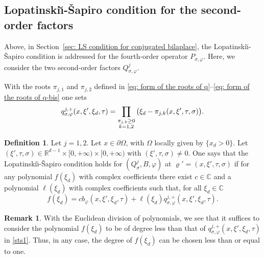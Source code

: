 \documentclass[JEP,XML,SOM,Unicode,published]{cedram}
\theoremstyle{plain}
\theoremstyle{definition}
\newtheorem{definition}[theorem]{Definition}
\newtheorem{remark}[theorem]{Remark}
\def\R{\mathbb{R}}
\def\C{\mathbb{C}}
\newcommand{\LS}{Lopatinski\u{\i}-\v{S}apiro\xspace}
\let\k\kappa
\let\y\varrho
\let \Im \relax
\DeclareMathOperator{\Im}{Im}
\newcommand{\Qsig}{Q_{\sigma}}
\newcommand{\Pconj}{P_{\sigma,\varphi}}
\newcommand{\Qconj}{Q_{\sigma,\varphi}}
\newcommand{\qconj}{q_{\sigma,\varphi}}
\begin{document}
\subsection{Lopatinski\u{\i}-\v{S}apiro condition for the
second-order factors}

Above, in Section~\ref{sec: LS condition for conjugated bilaplace}, the \LS condition is addressed for the
fourth-order operator $\Pconj$. Here, we consider the
two second-order factors $\Qconj^j$.

With the roots $\pi_{j,1}$ and $\pi_{j,2}$ defined in \eqref{eq: form of the roots of q}--\eqref{eq: form of the
roots of q-bis} one sets
\begin{equation*}
\qconj^{j,+} (x,\xi', \xi_d ,\tau)
=\prod_{\substack{\Im\pi_{j,k} \geq 0\\k=1,2}}
\big(\xi_d-\pi_{j,k} (x,\xi',\tau,\sigma) \big).
\end{equation*}

\begin{definition}\label{de2}
Let $j=1,2$. Let $x \in \partial\Omega$, with $\Omega$ locally given by
$\{ x_d>0\}$.
Let $(\xi',\tau,\sigma)\in \R^{d-1}\times [0,+\infty) \times
[0,+\infty)$ with
$(\xi',\tau,\sigma)\neq0$. One says that the \LS condition holds for
$(\Qsig^j,B, \varphi)$ at $\y' = (x,\xi',\tau,\sigma)$ if for any
polynomial $f(\xi_d)$ with complex coefficients there
exist $c\in\C$ and a polynomial $\ell(\xi_d)$ with
complex coefficients such that, for all $\xi_d\in\C$
\begin{equation}\label{sts1}
f(\xi_d)=c b_{\varphi}(x,\xi',\xi_d,\tau)
+\ell(\xi_d) \qconj^{j,+}(x,\xi',\xi_d,\tau).
\end{equation}
\end{definition}

\begin{remark}
\label{sts2}
With the Euclidean division of polynomials, we see that it suffices
to consider the polynomial $f(\xi_d)$ to be of degree less
than that of $\qconj^{j,+} (x,\xi',\xi_d,\tau)$ in
\eqref{sts1}. Thus, in any case, the degree of $f(\xi_d)$ can be chosen
less than or equal to one.
\end{remark}
\end{document}

